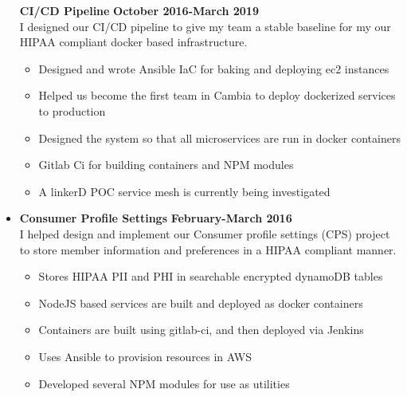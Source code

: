 \documentclass[overlapped]{res}
\begin{document}
\begin{resume}
\begin{itemize}[leftmargin=0in]
\begin{samepage}
                \textbf{CI/CD Pipeline} \hfill \textbf{October 2016-March 2019} \\
                I designed our CI/CD pipeline to give my team a stable baseline for my our HIPAA compliant docker based infrastructure.
                \begin{itemize}
                    \item[\textbullet] Designed and wrote Ansible IaC for baking and deploying ec2 instances
                    \item[\textbullet] Helped us become the first team in Cambia to deploy dockerized services to production
                    \item[\textbullet] Designed the system so that all microservices are run in docker containers
                    \item[\textbullet] Gitlab Ci for building containers and NPM modules
                    \item[\textbullet] A linkerD POC service mesh is currently being investigated
                \end{itemize}
            \end{samepage}
            \vspace{0.125in}
        \item[] 
            \begin{samepage}
                \textbf{Consumer Profile Settings} \hfill \textbf{February-March 2016} \\
                I helped design and implement our Consumer profile settings (CPS) project to store member information and preferences in a HIPAA compliant manner.
                \begin{itemize}
                    \item[\textbullet] Stores HIPAA PII and PHI in searchable encrypted dynamoDB tables
                    \item[\textbullet] NodeJS based services are built and deployed as docker containers
                    \item[\textbullet] Containers are built using gitlab-ci, and then deployed via Jenkins
                    \item[\textbullet] Uses Ansible to provision resources in AWS
                    \item[\textbullet] Developed several NPM modules for use as utilities
                \end{itemize}

\end{samepage}
\end{itemize}
\end{resume}
\end{document}
